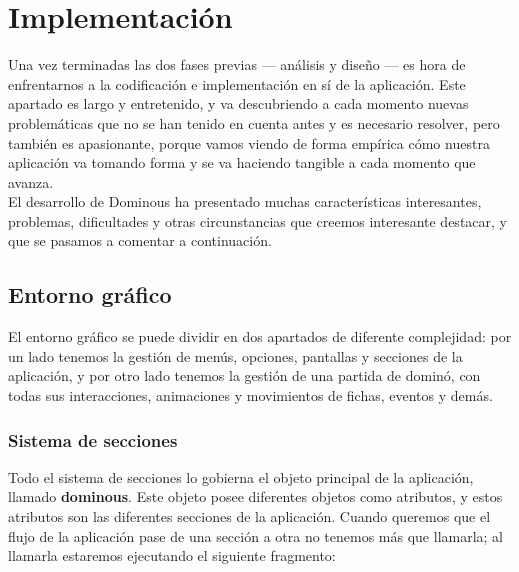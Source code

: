 

\section{Implementación}

Una vez terminadas las dos fases previas --- análisis y diseño --- es hora de enfrentarnos a la codificación e implementación
en sí de la aplicación. Este apartado es largo y entretenido, y va descubriendo a cada momento nuevas problemáticas que
no se han tenido en cuenta antes y es necesario resolver, pero también es apasionante, porque vamos viendo de forma
empírica cómo nuestra aplicación va tomando forma y se va haciendo tangible a cada momento que avanza. \\

El desarrollo de Dominous ha presentado muchas características interesantes, problemas, dificultades y otras circunstancias
que creemos interesante destacar, y que se pasamos a comentar a continuación.

\subsection{Entorno gráfico}

El entorno gráfico se puede dividir en dos apartados de diferente complejidad: por un lado tenemos la gestión de menús,
opciones, pantallas y secciones de la aplicación, y por otro lado tenemos la gestión de una partida de dominó, con todas
sus interacciones, animaciones y movimientos de fichas, eventos y demás.

\subsubsection{Sistema de secciones}

Todo el sistema de secciones lo gobierna el objeto principal de la aplicación, llamado \textbf{dominous}. Este objeto posee
diferentes objetos como atributos, y estos atributos son las diferentes secciones de la aplicación. Cuando queremos
que el flujo de la aplicación pase de una sección a otra no tenemos más que llamarla; al llamarla estaremos ejecutando
el siguiente fragmento:

